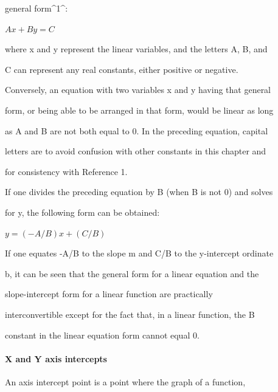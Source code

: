 general form^1^:







$A x + B y = C \,$







where x and y represent the linear variables, and the letters A, B, and

C can represent any real constants, either positive or negative.

Conversely, an equation with two variables x and y having that general

form, or being able to be arranged in that form, would be linear as long

as A and B are not both equal to 0. In the preceding equation, capital

letters are to avoid confusion with other constants in this chapter and

for consistency with Reference 1.



If one divides the preceding equation by B (when B is not 0) and solves

for y, the following form can be obtained:







$y = (-A/B) x + (C/B) \,$







If one equates -A/B to the slope m and C/B to the y-intercept ordinate

b, it can be seen that the general form for a linear equation and the

slope-intercept form for a linear function are practically

interconvertible except for the fact that, in a linear function, the B

constant in the linear equation form cannot equal 0.



\paragraph{X and Y axis intercepts}



An axis intercept point is a point where the graph of a function,


